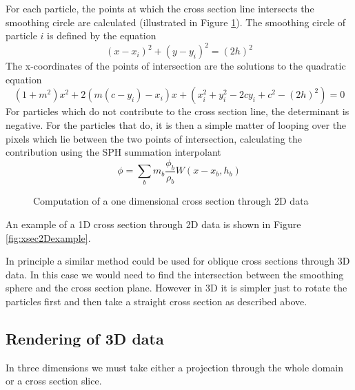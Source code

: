 \documentclass[a4paper,12pt]{article}
\begin{document}
 For each particle, the points at which the cross section line intersects the
smoothing circle are calculated (illustrated in Figure \ref{fig:xsec2D}). The
smoothing circle of particle $i$ is defined by the equation
\begin{equation}
(x-x_i)^2 + (y-y_i)^2 = (2h)^2
\end{equation}
The x-coordinates of the points of intersection are the solutions to the quadratic equation
\begin{equation}
(1 + m^2) x^2 + 2 (m (c - y_i) - x_i) x + (x_i^2 + y_i^2 - 2cy_i + c^2 - (2h)^2)= 0
\end{equation}
For particles which do not contribute to the cross section line, the determinant
is negative. For the particles that do, it is then a simple matter of looping
over the pixels which lie between the two points of intersection, calculating
the contribution using the SPH summation interpolant
\begin{equation}
\phi = \sum_b m_b \frac{\phi_b}{\rho_b} W(x - x_b, h_b)
\end{equation}

\begin{figure}
\begin{center}
\caption{Computation of a one dimensional cross section through 2D data}
\label{fig:xsec2D}
\end{center}
\end{figure}
 
 An example of a 1D cross section through 2D data is shown in Figure
\ref{fig:xsec2Dexample}.
\begin{figure}
\begin{center}
\end{center}
\end{figure}

 In principle a similar method could be used for oblique cross sections
through 3D data. In this case we would need to find the intersection
between the smoothing sphere and the cross section plane. However
in 3D it is simpler just to rotate the particles first and then take
a straight cross section as described above.

\subsection{Rendering of 3D data}
 In three dimensions we must take either a projection through the whole domain or a cross section slice.
 
\end{document}
